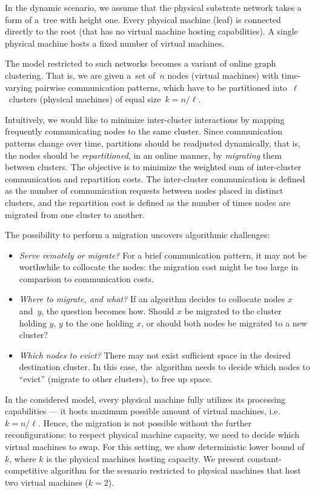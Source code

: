 In the dynamic scenario, we assume that the physical substrate network takes a form of a~tree with height one.
Every physical machine (leaf) is connected directly to the root (that has no virtual machine hosting capabilities).
A single physical machine hosts a fixed number of virtual machines.

The model restricted to such networks becomes a variant of online graph clustering.
That is, we are given a~set of~$n$ nodes (virtual machines) with time-varying pairwise
communication patterns, which have to be partitioned into~$\ell$~clusters (physical machines) of
equal size~$k=n/\ell$.

Intuitively, we would like to minimize inter-cluster
interactions by mapping frequently communicating nodes to the same cluster.
Since communication patterns change over time, partitions should be
readjusted dynamically, that is, the nodes should be \emph{repartitioned}, in
an online manner, by \emph{migrating} them between clusters.
The objective is to minimize the weighted sum of inter-cluster communication and repartition costs.
The inter-cluster communication is defined as the number of communication requests between nodes placed in distinct clusters, and the repartition cost is defined as the number of times nodes are migrated from one cluster to
another.


The possibility to perform a migration uncovers algorithmic challenges:
\begin{itemize}

\item \emph{Serve remotely or migrate?} For a brief communication
pattern, it may not be worthwhile to collocate the nodes: the migration cost might
be too large in comparison to communication costs.

\item \emph{Where to migrate, and what?}
If an algorithm decides to collocate nodes $x$ and~$y$, the question becomes
how. Should $x$ be migrated to the cluster holding $y$, $y$ to the one holding
$x$, or should both nodes be migrated to a new cluster?

\item \emph{Which nodes to evict?}
There may not exist sufficient space in the desired destination cluster. In
this case, the~algorithm needs to decide which nodes to ``evict'' (migrate to
other clusters), to free up space.

\end{itemize}

In the considered model, every physical machine fully utilizes its processing capabilities --- it hosts maximum possible amount of virtual machines, i.e. $k=n/\ell$.
Hence, the migration is not possible without the further reconfigurations: to respect physical machine capacity, we need to decide which virtual machines to swap.
For this setting, we show deterministic lower bound of $k$, where $k$ is the physical machines hosting capacity.
We present constant-competitive algorithm for the scenario restricted to physical machines that host two virtual machines ($k = 2$).

